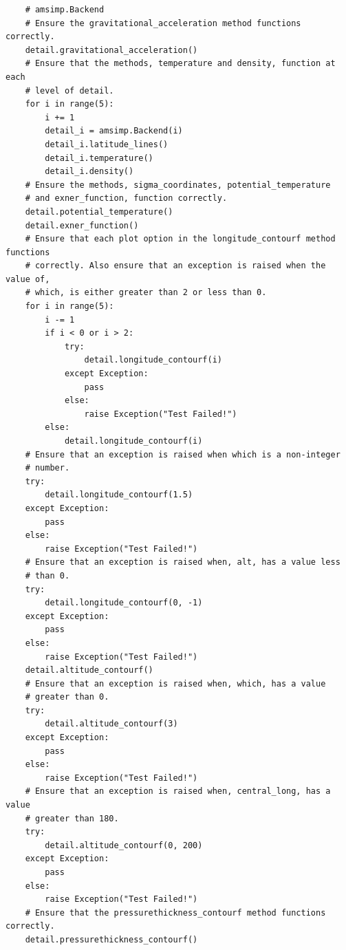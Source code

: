 \begin{appendices}
\begin{verbatim}
    # amsimp.Backend
    # Ensure the gravitational_acceleration method functions correctly.
    detail.gravitational_acceleration()
    # Ensure that the methods, temperature and density, function at each
    # level of detail.
    for i in range(5):
        i += 1
        detail_i = amsimp.Backend(i)
        detail_i.latitude_lines()
        detail_i.temperature()
        detail_i.density()
    # Ensure the methods, sigma_coordinates, potential_temperature
    # and exner_function, function correctly.
    detail.potential_temperature()
    detail.exner_function()
    # Ensure that each plot option in the longitude_contourf method functions
    # correctly. Also ensure that an exception is raised when the value of,
    # which, is either greater than 2 or less than 0.
    for i in range(5):
        i -= 1
        if i < 0 or i > 2:
            try:
                detail.longitude_contourf(i)
            except Exception:
                pass
            else:
                raise Exception("Test Failed!")
        else:
            detail.longitude_contourf(i)
    # Ensure that an exception is raised when which is a non-integer
    # number.
    try:
        detail.longitude_contourf(1.5)
    except Exception:
        pass
    else:
        raise Exception("Test Failed!")
    # Ensure that an exception is raised when, alt, has a value less
    # than 0.
    try:
        detail.longitude_contourf(0, -1)
    except Exception:
        pass
    else:
        raise Exception("Test Failed!")
    detail.altitude_contourf()
    # Ensure that an exception is raised when, which, has a value
    # greater than 0.
    try:
        detail.altitude_contourf(3)
    except Exception:
        pass
    else:
        raise Exception("Test Failed!")
    # Ensure that an exception is raised when, central_long, has a value
    # greater than 180.
    try:
        detail.altitude_contourf(0, 200)
    except Exception:
        pass
    else:
        raise Exception("Test Failed!")
    # Ensure that the pressurethickness_contourf method functions correctly.
    detail.pressurethickness_contourf()
    

\end{verbatim}
\end{appendices}

